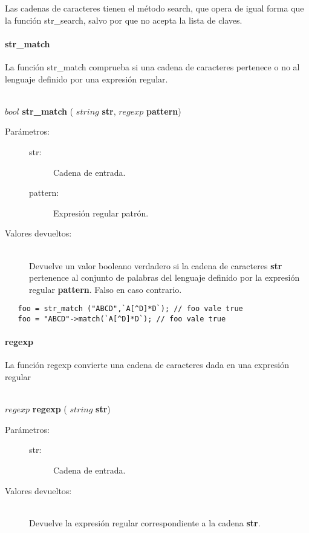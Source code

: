 Las cadenas de caracteres tienen el método search, que opera de igual forma que la
función str\_search, salvo por que no acepta la lista de claves.

\paragraph{str\_match}
La función str\_match comprueba si una cadena de caracteres pertenece o no al
lenguaje definido por una expresión regular.

\begin{framed}
\hfill \\ $bool$ \textbf{str\_match} ( $string$ \textbf{str}, $regexp$ \textbf{pattern})  
\begin{description}
\item [Parámetros:] \hfill 
   \begin{description}
   \item[str:] Cadena de entrada.
   \item[pattern:] Expresión regular patrón. 
   \end{description}
\item[Valores devueltos:] \hfill \\
   Devuelve un valor booleano verdadero si la cadena de caracteres \textbf{str} pertenence
   al conjunto de palabras del lenguaje definido por la expresión regular \textbf{pattern}. Falso
   en caso contrario.
\end{description}
\end{framed}

\begin{lstlisting}   
   foo = str_match ("ABCD",`A[^D]*D`); // foo vale true
   foo = "ABCD"->match(`A[^D]*D`); // foo vale true
\end{lstlisting}


\paragraph{regexp}
La función regexp convierte una cadena de caracteres dada en una expresión regular

\begin{framed}
\hfill \\ $regexp$ \textbf{regexp} ( $string$ \textbf{str})  
\begin{description}
\item [Parámetros:] \hfill 
   \begin{description}
   \item[str:] Cadena de entrada.
   \end{description}
\item[Valores devueltos:] \hfill \\
   Devuelve la expresión regular correspondiente a la cadena \textbf{str}.
\end{description}
\end{framed}

